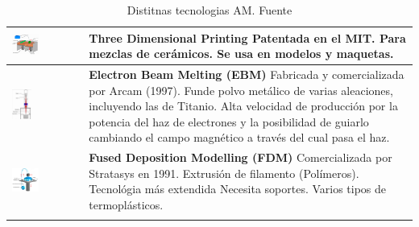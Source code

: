\begin{longtable}{| >{\centering\arraybackslash}m{8cm} | >{\centering\arraybackslash}m{7cm}|}
     \hline
    \centering\includegraphics[width=0.4\textwidth]{./images/3d_mit.png}
    & \textbf{Three Dimensional Printing}
     Patentada en el MIT.
     Para mezclas de cerámicos.
     Se usa en modelos y maquetas.\\[95pt]
    \hline
    \centering\includegraphics[width=0.3\textwidth]{./images/ebm.png}
    & \textbf{Electron Beam Melting (EBM)}
     Fabricada y comercializada por Arcam (1997).
     Funde polvo metálico de varias aleaciones, incluyendo las de Titanio.
     Alta velocidad de producción por la potencia del haz de electrones y la posibilidad de guiarlo cambiando el campo magnético a través del cual pasa el haz.\\[80pt]
    \hline
    \centering\includegraphics[width=0.4\textwidth]{./images/fdm.png}
    & \textbf{Fused Deposition Modelling (FDM)}
     Comercializada por Stratasys en 1991.
     Extrusión de filamento (Polímeros).
     Tecnológia más extendida
     Necesita soportes.
     Varios tipos de termoplásticos.\\[150pt]
     \hline


     \caption{Distitnas tecnologias AM. Fuente \cite{FabricacionAditiva}}
     \label{tab:AM}
\end{longtable}


